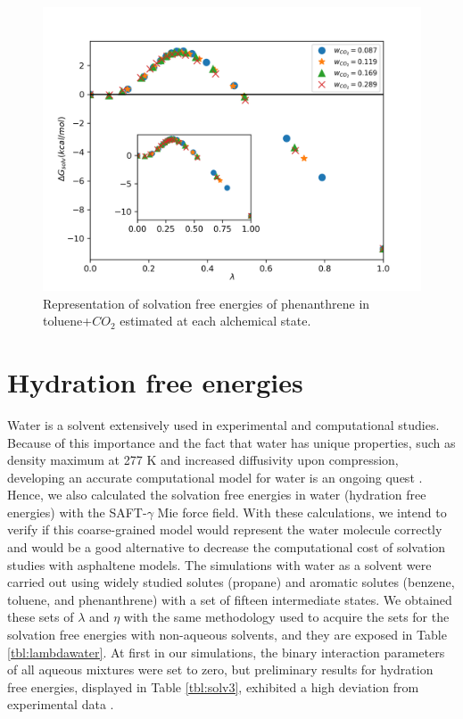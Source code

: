 \begin{figure}[H]
	\centering
	\includegraphics[width=0.8\linewidth]{Figures/tolco2}
	\caption{Representation of solvation free energies of phenanthrene in toluene+$CO_{2}$ estimated at each alchemical state.}
	\label{fig:Figure_1}
\end{figure}


\section{Hydration free energies}

Water is a solvent extensively used in experimental and computational studies. Because of this importance and the fact that water has unique properties, such as density maximum at 277 K and increased diffusivity upon compression, developing an accurate computational model for water is an ongoing quest \cite{hadley2012}. Hence, we also calculated the solvation free energies in water (hydration free energies) with the SAFT-$\gamma$ Mie force field. With these calculations, we intend to verify if this coarse-grained model would represent the water molecule correctly and would be a good alternative to decrease the computational cost of solvation studies with asphaltene models. The simulations with water as a solvent were carried out using widely studied solutes (propane) and aromatic solutes (benzene, toluene, and phenanthrene) with a set of fifteen intermediate states.  We obtained these sets of $\lambda$ and $\eta$ with the same methodology used to acquire the sets for the solvation free energies with non-aqueous solvents, and they are exposed in Table \ref{tbl:lambdawater}. At first in our simulations, the binary interaction parameters of all aqueous mixtures were set to zero, but preliminary results for hydration free energies, displayed in Table \ref{tbl:solv3},  exhibited a high deviation from experimental data \cite{P29900000291, doi:10.1021/ct050097l}.

